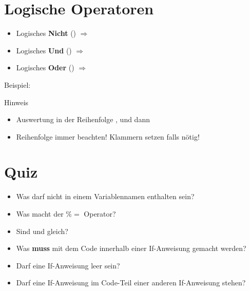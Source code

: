\livecoding

\section{Logische Operatoren}
\begin{frame}
	\slidehead
	\vspace{-0.1cm}
	\begin{itemize}
		\item Logisches \textbf{Nicht} ()  $\Rightarrow$ 
		\item Logisches \textbf{Und} () $\Rightarrow$ 
		\item Logisches \textbf{Oder} ()  $\Rightarrow$ 
	\end{itemize}
	\vspace{-0.15cm}
	\begin{block}{Beispiel:}
	\end{block}
	\vspace{-0.15cm}
	\begin{block}{Hinweis}
		\begin{itemize}
			\item Auswertung in der Reihenfolge ,  und dann 
			\item Reihenfolge immer beachten! Klammern setzen falls nötig!
		\end{itemize}


	\end{block}
\end{frame}

\livecoding

\section{Quiz}
\begin{frame}
	\slidehead

	\begin{itemize}
		\item Was darf nicht in einem Variablennamen enthalten sein?
		\pause
		\item Was macht der \textbf{$\%=$} Operator?%
		\pause
		\item Sind \pythoninline{=} und \pythoninline{==} gleich?
		\pause
		\item Was \textbf{muss} mit dem Code innerhalb einer If-Anweisung gemacht werden?
		\pause
		\item Darf eine If-Anweisung leer sein?
		\pause
		\item Darf eine If-Anweisung im Code-Teil einer anderen If-Anweisung stehen?
	\end{itemize}
\end{frame}



